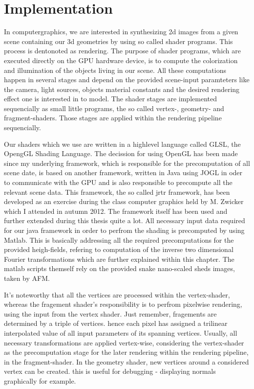 \chapter{Implementation}
In computergraphics, we are interested in synthesizing 2d images from a given scene containing our 3d geometries by using so called shader programs. This process is dentonoted as rendering.
The purpose of shader programs, which are executed directly on the GPU hardware device, is to compute the colorization and illumination of the objects living in our scene. All these computations happen in several stages and depend on the provided scene-input paramteters like the camera, light sources, objects material constants and the desired rendering effect one is interested in to model. The shader stages are implemented sequencially as small little programs, the so called vertex-, geometry- and fragment-shaders. Those stages are applied within the rendering pipeline sequencially. 

Our shaders which we use are written in a highlevel language called GLSL, the OpengGL Shading Language. The decission for using OpenGL has been made since my underlying framework, which is responsible for the precomputation of all scene date, is based on another framework, written in Java using JOGL in oder to communicate with the GPU and is also responsible to precompute all the relevant scene data. This framework, the so called jrtr framework, has been developed as an exercise during the class computer graphics held by M. Zwicker which I attended in autumn 2012. The framework itself has been used and further extended during this thesis quite a lot. All necessary input data required for our java framework in order to perfrom the shading is precomputed by using Matlab. This is basically addressing all the required precomputations for the provided heigh-fields, refering to computation of the inverse two dimensional Fourier transformations which are further explained within this chapter. The matlab scripts themself rely on the provided snake nano-scaled sheds images, taken by AFM.

It's noteworthy that all the vertices are processed within the vertex-shader, whereas the fragement shader's responsibility is to perfrom pixelwise rendering, using the input from the vertex shader. Just remember, fragements are determined by a triple of vertices. hence each pixel has assigned a trilinear interpolated value of all input parameters of its spanning vertices.
Usually, all necessary transformations are applied vertex-wise, considering the vertex-shader as the precomputation stage for the later rendering within the rendering pipeline, in the fragment-shader. In the geometry shader, new vertices around a considered vertex can be created. this is useful for debugging - displaying normals graphically for example.

